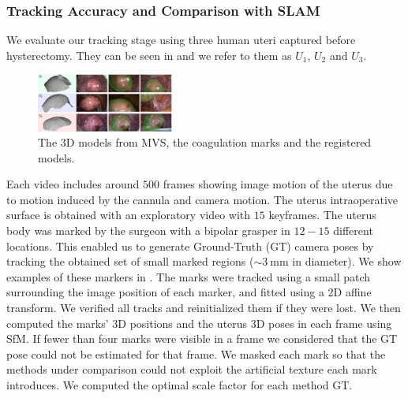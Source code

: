 \subsubsection{Tracking Accuracy and Comparison with SLAM}
We evaluate our tracking stage using three human uteri captured before hysterectomy.
They can be seen in  and we refer to them as $U_1$, $U_2$ and $U_3$.
\begin{figure}[htb]
  \centering
  \includegraphics[width=0.4\textwidth]{./figs/snapshotsCompressed.pdf}
\caption{The 3D models from MVS, the coagulation marks and the registered models.}
\label{fig:hister}
\vspace{-5mm}
\end{figure}
Each video includes around $500$ frames showing image motion of the uterus due to motion induced by the cannula and camera motion.
The uterus intraoperative surface is obtained with an exploratory video with $15$ keyframes.
The uterus body was marked by the surgeon with a bipolar grasper in $12-15$ different locations.
This enabled us to generate Ground-Truth (GT) camera poses by tracking the obtained set of small marked regions ($\sim\SI{3}{\milli\metre}$ in diameter).
We show examples of these markers in . 
The marks were tracked using a small patch surrounding the image position of each marker, and fitted using a 2D affine transform. 
We verified all tracks and reinitialized them if they were lost.
We then computed the marks' 3D positions and the uterus 3D poses in each frame using SfM\@.
If fewer than four marks were visible in a frame we considered that the GT pose could not be estimated for that frame.
We masked each mark so that the methods under comparison could not exploit the artificial texture each mark introduces. 
We computed the optimal scale factor for each method \wrt GT\@.

